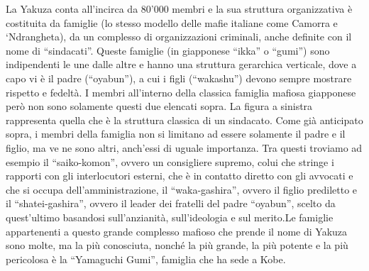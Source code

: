 \documentclass[a4paper, 11pt]{article}
\begin{document}

La Yakuza conta all’incirca da 80'000 membri e la sua struttura organizzativa è costituita da famiglie (lo stesso modello delle mafie italiane come Camorra e ‘Ndrangheta), da un complesso di organizzazioni criminali, anche definite con il nome di “sindacati”. Queste famiglie (in giapponese “ikka” o “gumi”) sono indipendenti le une dalle altre e hanno una struttura gerarchica verticale, dove a capo vi è il padre (“oyabun”), a cui i figli (“wakashu”) devono sempre mostrare rispetto e fedeltà. I membri all’interno della classica famiglia mafiosa giapponese però non sono solamente questi due elencati sopra.
La figura a sinistra rappresenta quella che è la struttura classica di un sindacato. Come già anticipato sopra, i membri della famiglia non si limitano ad essere solamente il padre e il figlio, ma ve ne sono altri, anch’essi di uguale importanza. Tra questi troviamo ad esempio il “saiko-komon”, ovvero un consigliere supremo, colui che stringe i rapporti con gli interlocutori esterni, che è in contatto diretto con gli avvocati e che si occupa dell’amministrazione, il “waka-gashira”, ovvero il figlio prediletto e il “shatei-gashira”, ovvero il leader dei fratelli del padre “oyabun”, scelto da quest’ultimo basandosi sull’anzianità, sull’ideologia e sul merito.Le famiglie appartenenti a questo grande complesso mafioso che prende il nome di Yakuza sono molte, ma la più conosciuta, nonché la più grande, la più potente e la più pericolosa è la “Yamaguchi Gumi”, famiglia che ha sede a Kobe.
\end{document}
